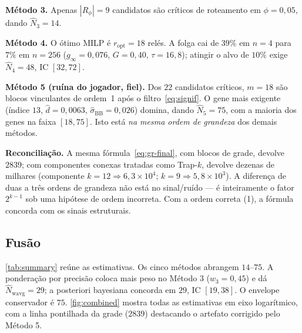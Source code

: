 \documentclass[conference]{IEEEtran}
\newcommand{\Nhat}{\hat{N}}
\newcommand{\sBB}{\sigma_{\mathrm{BB}}}
\begin{document}
\textbf{Método 3.} Apenas $|R_\phi|=9$ candidatos são críticos de roteamento em
$\phi=0{,}05$, dando $\Nhat_3=14$.

\textbf{Método 4.} O ótimo MILP é $r_{\mathrm{opt}}=18$ relés. A folga cai de
$39\%$ em $n=4$ para $7\%$ em $n=256$ ($g_\infty=0{,}076$, $G=0{,}40$,
$\tau=16{,}8$); atingir o alvo de $10\%$ exige $\Nhat_4=48$, IC $[32,72]$.

\textbf{Método 5 (ruína do jogador, fiel).} Dos $22$ candidatos críticos, $m=18$
são blocos vinculantes de ordem~1 após o filtro~\eqref{eq:signif}. O gene mais
exigente (índice $13$, $\widehat d=0{,}0063$, $\widehat\sBB=0{,}026$) domina,
dando $\Nhat_5=75$, com a maioria dos genes na faixa $[18,75]$. Isto está
\emph{na mesma ordem de grandeza} dos demais métodos.

\textbf{Reconciliação.} A mesma fórmula~\eqref{eq:gr-final}, com blocos de grade,
devolve $2839$; com componentes conexas tratadas como Trap-$k$, devolve dezenas de
milhares (componente $k=12\Rightarrow 6{,}3\times10^4$; $k=9\Rightarrow 5{,}8\times
10^3$). A diferença de duas a três ordens de grandeza não está no sinal/ruído --- é
inteiramente o fator $2^{k-1}$ sob uma hipótese de ordem incorreta. Com a ordem
correta (1), a fórmula concorda com os sinais estruturais.

\subsection{Fusão}
\autoref{tab:summary} reúne as estimativas. Os cinco métodos abrangem $14$--$75$. A
ponderação por precisão coloca mais peso no Método 3 ($w_3=0{,}45$) e dá
$\Nhat_{\mathrm{wavg}}=29$; a posteriori bayesiana concorda em $29$, IC $[19,38]$.
O envelope conservador é $75$. \autoref{fig:combined} mostra todas as estimativas
em eixo logarítmico, com a linha pontilhada da grade ($2839$) destacando o
artefato corrigido pelo Método 5.
\end{document}
